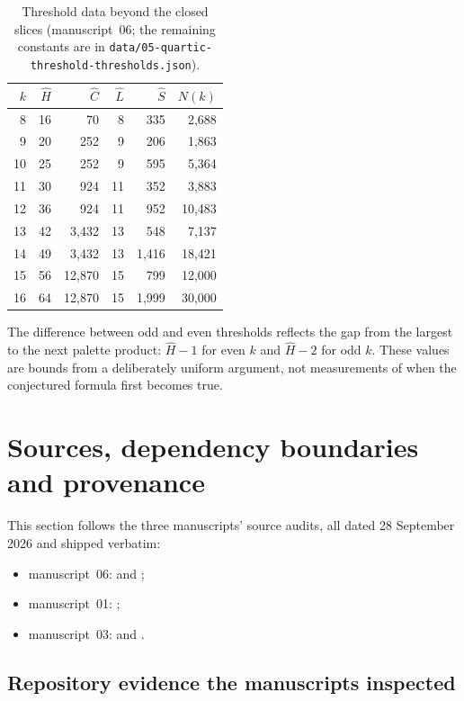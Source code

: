 \documentclass[11pt,a4paper]{article}
\numberwithin{equation}{section}
\theoremstyle{definition}
\theoremstyle{remark}
\begin{document}
\begin{table}[htbp]
\centering
\small
\begin{tabular}{@{}rrrrrr@{}}
\toprule
$k$ & $\hat H$ & $\hat C$ & $\hat L$ & $\hat S$ & $N(k)$\\
\midrule
8 & 16 & 70 & 8 & 335 & 2,688\\
9 & 20 & 252 & 9 & 206 & 1,863\\
10 & 25 & 252 & 9 & 595 & 5,364\\
11 & 30 & 924 & 11 & 352 & 3,883\\
12 & 36 & 924 & 11 & 952 & 10,483\\
13 & 42 & 3,432 & 13 & 548 & 7,137\\
14 & 49 & 3,432 & 13 & 1,416 & 18,421\\
15 & 56 & 12,870 & 15 & 799 & 12,000\\
16 & 64 & 12,870 & 15 & 1,999 & 30,000\\
\bottomrule
\end{tabular}
\caption{Threshold data beyond the closed slices (manuscript~06; the
remaining constants are in
\texttt{data/05-quartic-threshold-thresholds.json}).}
\label{evo:tab:thresholds}
\end{table}

The difference between odd and even thresholds reflects the gap from the
largest to the next palette product: $\hat H-1$ for even $k$ and $\hat H-2$
for odd $k$. These values are bounds from a deliberately uniform argument, not
measurements of when the conjectured formula first becomes true.

\section{Sources, dependency boundaries and provenance}\label{evo:sec:audit}

This section follows the three manuscripts' source audits, all dated
28 September 2026 and shipped verbatim:
\begin{itemize}
\item manuscript~06:  and
 ;
\item manuscript~01: ;
\item manuscript~03:  and
 .
\end{itemize}

\subsection{Repository evidence the manuscripts inspected}
\end{document}
